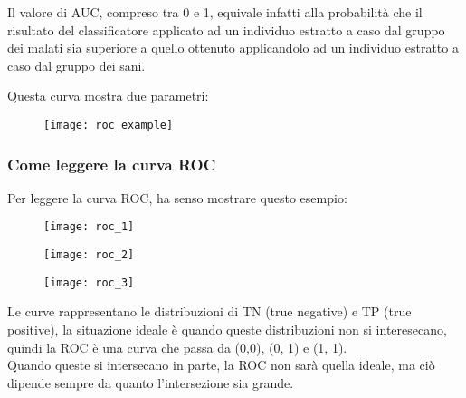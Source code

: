 Il valore di AUC, compreso tra 0 e 1, equivale infatti alla probabilità che il risultato del classificatore applicato ad un individuo estratto a caso dal gruppo dei malati sia superiore a quello ottenuto applicandolo ad un individuo estratto a caso dal gruppo dei sani.

Questa curva mostra due parametri:

\begin{figure}[H]
	\centering
	\texttt{[image: roc\_example]}	
\end{figure}

\subsubsection{Come leggere la curva ROC}

Per leggere la curva ROC, ha senso mostrare questo esempio:

\begin{figure}[H]
	\centering
	\texttt{[image: roc\_1]}	
\end{figure}
\begin{figure}[H]
	\centering
	\texttt{[image: roc\_2]}	
\end{figure}
\begin{figure}[H]
	\centering
	\texttt{[image: roc\_3]}	
\end{figure}

Le curve rappresentano le distribuzioni di TN (true negative) e TP (true positive), la situazione ideale è quando queste distribuzioni non si interesecano, quindi la ROC è una curva che passa da (0,0), (0, 1) e (1, 1).\\
Quando queste si intersecano in parte, la ROC non sarà quella ideale, ma ciò dipende sempre da quanto l'intersezione sia grande.

